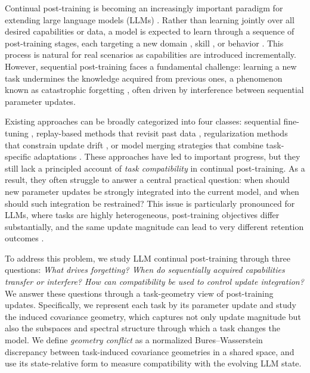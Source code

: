 \documentclass{article}
\begin{document}
Continual post-training is becoming an increasingly important paradigm for extending large language models (LLMs) \cite{shi2025continual,kumar2025llm}. Rather than learning jointly over all desired capabilities or data, a model is expected to learn through a sequence of post-training stages, each targeting a new domain \cite{ke2025demystifying,zhao2025redone}, skill \cite{tang2025synthesizing,yano2025lamdagent}, or behavior \cite{tan2025scaling,du2025post}. This process is natural for real scenarios as capabilities are introduced incrementally. However, sequential post-training faces a fundamental challenge: learning a new task undermines the knowledge acquired from previous ones, a phenomenon known as catastrophic forgetting \cite{van2024continual,loke2025overcoming}, often driven by interference between sequential parameter updates.

Existing approaches can be broadly categorized into four classes: sequential fine-tuning \cite{ke2022continual,wang2025see}, replay-based methods that revisit past data \cite{hickok2025scalable,rolnick2019experience}, regularization methods that constrain update drift \cite{ahn2019uncertainty,pomponi2020efficient}, or model merging strategies that combine task-specific adaptations  \cite{feng2025aimmerging,zhang2025merge}.
These approaches have led to important progress, but they still lack a principled account of \emph{task compatibility} in continual post-training. As a result, they often struggle to answer a central practical question: when should new parameter updates be strongly integrated into the current model, and when should such integration be restrained? This issue is particularly pronounced for LLMs, where tasks are highly heterogeneous, post-training objectives differ substantially, and the same update magnitude can lead to very different retention outcomes \cite{wang2025model}.

\vspace{-0.1em}
To address this problem, we study LLM continual post-training through three questions:
\textit{What drives forgetting? When do sequentially acquired capabilities transfer or interfere? How can compatibility be used to control update integration?}
We answer these questions through a task-geometry view of post-training updates.
Specifically, we represent each task by its parameter update and study the induced covariance geometry, which captures not only update magnitude but also the subspaces and spectral structure through which a task changes the model.
We define \emph{geometry conflict} as a normalized Bures--Wasserstein discrepancy \cite{bhatia2019bures} between task-induced covariance geometries in a shared space, and use its state-relative form to measure compatibility with the evolving LLM state.
\end{document}
